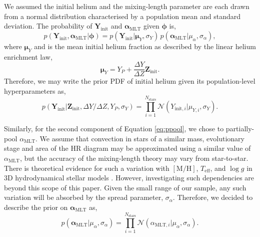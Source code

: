 \documentclass[a4paper,fleqn,usenatbib]{mnras}
\newcommand{\metallicity}{\ensuremath{[\mathrm{M}/\mathrm{H}]}}
\newcommand{\teff}{\ensuremath{T_\mathrm{eff}}}
\newcommand{\mlt}{\ensuremath{{\alpha_\mathrm{MLT}}}}
\begin{document}
We assumed the initial helium and the mixing-length parameter are each drawn from a normal distribution characterised by a population mean and standard deviation. The probability of $\boldsymbol{Y}_\mathrm{init}$ and $\boldsymbol{\alpha}_\mathrm{MLT}$ given $\boldsymbol{\phi}$ is,
%
\begin{equation}
    p(\boldsymbol{Y}_\mathrm{init}, \boldsymbol{\alpha}_\mathrm{MLT} | \boldsymbol{\phi}) = p(\boldsymbol{Y}_\mathrm{init} | \boldsymbol{\mu}_Y, \sigma_Y) \, p(\boldsymbol{\alpha}_\mathrm{MLT} | \mu_\alpha, \sigma_\alpha),
    \label{eq:ppool}
\end{equation}
%
where $\boldsymbol{\mu}_Y$ and is the mean initial helium fraction as described by the linear helium enrichment law,
%
\begin{equation}
    \boldsymbol{\mu}_{Y} = Y_P + \frac{\Delta Y}{\Delta Z} \boldsymbol{Z}_{\mathrm{init}}.\label{eq:helium}
\end{equation}
%
Therefore, we may write the prior PDF of initial helium given its population-level hyperparameters as,
%
\begin{equation}
    p(\boldsymbol{Y}_{\mathrm{init}} | \boldsymbol{Z}_{\mathrm{init}}, {\Delta Y}/{\Delta Z}, Y_P, \sigma_Y) = \prod_{i=1}^{N_\mathrm{stars}} \mathcal{N}({Y}_{\mathrm{init}, i} | {\mu}_{Y, i}, \sigma_Y).
\end{equation}
%

Similarly, for the second component of Equation \ref{eq:ppool}, we chose to partially-pool $\mlt$. We assume that convection in stars of a similar mass, evolutionary stage and area of the HR diagram may be approximated using a similar value of $\mlt$, but the accuracy of the mixing-length theory may vary from star-to-star. There is theoretical evidence for such a variation with $\metallicity$, $\teff$, and $\log{g}$ in 3D hydrodynamical stellar models \citep{Magic.Weiss.ea2015,Viani.Basu.ea2018}. However, investigating such dependencies are beyond this scope of this paper. Given the small range of our sample, any such variation will be absorbed by the spread parameter, $\sigma_\alpha$. Therefore, we decided to describe the prior on $\boldsymbol{\alpha}_\mathrm{MLT}$ as,
%
\begin{equation}
    p(\boldsymbol{\alpha}_{\mathrm{MLT}} | \mu_\alpha, \sigma_\alpha) = \prod_{i=1}^{N_\mathrm{stars}} \mathcal{N}({\alpha}_{\mathrm{MLT}, i} | \mu_\alpha, \sigma_\alpha).
\end{equation}
%
\end{document}
